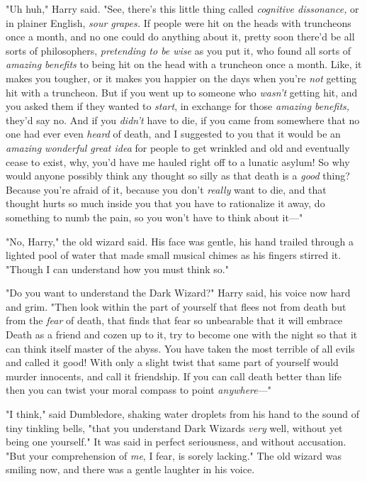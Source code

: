 "Uh huh," Harry said. "See, there's this little thing called \emph{cognitive
dissonance,} or in plainer English, \emph{sour grapes.} If people were hit on
the heads with truncheons once a month, and no one could do anything about it,
pretty soon there'd be all sorts of philosophers, \emph{pretending to be wise}
as you put it, who found all sorts of \emph{amazing benefits} to being hit on
the head with a truncheon once a month. Like, it makes you tougher, or it makes
you happier on the days when you're \emph{not} getting hit with a truncheon.
But if you went up to someone who \emph{wasn't} getting hit, and you asked them
if they wanted to \emph{start}, in exchange for those \emph{amazing benefits,}
they'd say no. And if you \emph{didn't} have to die, if you came from somewhere
that no one had ever even \emph{heard} of death, and I suggested to you that it
would be an \emph{amazing wonderful great idea} for people to get wrinkled and
old and eventually cease to exist, why, you'd have me hauled right off to a
lunatic asylum! So why would anyone possibly think any thought so silly as that
death is a \emph{good} thing? Because you're afraid of it, because you don't
\emph{really} want to die, and that thought hurts so much inside you that you
have to rationalize it away, do something to numb the pain, so you won't have
to think about it\mbox{---}"

"No, Harry," the old wizard said. His face was gentle, his hand trailed through
a lighted pool of water that made small musical chimes as his fingers stirred
it. "Though I can understand how you must think so."

"Do you want to understand the Dark Wizard?" Harry said, his voice now hard and
grim. "Then look within the part of yourself that flees not from death but from
the \emph{fear} of death, that finds that fear so unbearable that it will
embrace Death as a friend and cozen up to it, try to become one with the night
so that it can think itself master of the abyss. You have taken the most
terrible of all evils and called it good! With only a slight twist that same
part of yourself would murder innocents, and call it friendship. If you can
call death better than life then you can twist your moral compass to point
\emph{anywhere}\mbox{---}"

"I think," said Dumbledore, shaking water droplets from his hand to the sound
of tiny tinkling bells, "that you understand Dark Wizards \emph{very} well,
without yet being one yourself." It was said in perfect seriousness, and
without accusation. "But your comprehension of \emph{me}, I fear, is sorely
lacking." The old wizard was smiling now, and there was a gentle laughter in
his voice.

